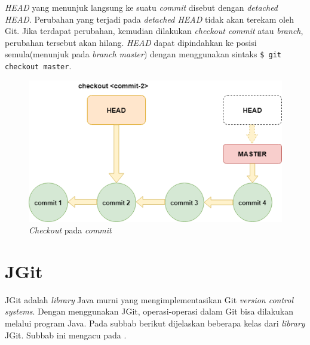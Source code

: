 \textit{HEAD} yang menunjuk langsung ke suatu \textit{commit} disebut dengan \textit{detached HEAD}. Perubahan yang terjadi pada \textit{detached HEAD} tidak akan terekam oleh Git. Jika terdapat perubahan, kemudian dilakukan \textit{checkout commit} atau \textit{branch}, perubahan tersebut akan hilang. \textit{HEAD} dapat dipindahkan ke posisi semula(menunjuk pada \textit{branch master}) dengan  menggunakan sintaks \texttt{\$ git checkout master}.


 
\begin{figure}[H]
	\centering
		\includegraphics[scale=0.6]{Gambar/gitcheckoutcommit.png}
	\caption{\textit{Checkout} pada \textit{commit}}
	\label{fig:git_checkout}
\end{figure}

\section{JGit}
\label{sec:jgit}
JGit adalah \textit{library} Java murni yang mengimplementasikan Git \textit{version control systems}\cite{JGit}. Dengan menggunakan JGit, operasi-operasi dalam Git bisa dilakukan melalui program Java. Pada subbab berikut dijelaskan beberapa kelas dari \textit{library} JGit. Subbab ini mengacu pada \cite{JGit_java_doc}. 

